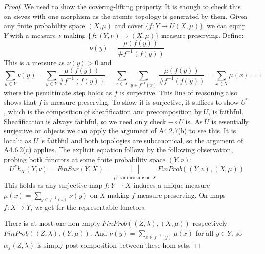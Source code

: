 \documentclass[a4paper]{amsproc}
\theoremstyle{plain}
\theoremstyle{definition}
\theoremstyle{remark}
\numberwithin{equation}{section}
\begin{document}
\begin{proof} We need to show the covering-lifting property. It is enough to check this on sieves with one morphism as the atomic topology is generated by them. Given any finite probability space $(X,\mu)$ and cover $\{f: Y\rightarrow U(X,\mu) \}$, we can equip $Y$ with a measure $\nu$ making $\{f: (Y,\nu)\rightarrow (X,\mu) \}$ measure preserving. Define:
\[\nu(y)=\frac{\mu(f(y))}{\# f^{-1}(f(y))} \]
This is a measure as $\nu(y)>0$ and
\[  \sum_{y\in Y}\nu(y)=\sum_{y\in Y}\frac{\mu(f(y))}{\# f^{-1}(f(y))}=\sum_{x\in X}\sum_{y\in f^{-1}(x)}\frac{\mu(f(y))}{\# f^{-1}(f(y))} =\sum_{x\in X}\mu(x)=1\]
where the penultimate step holds as $f$ is surjective. This line of reasoning also shows that $f$ is measure preserving. 
\newline \indent To show it is surjective, it suffices to show $U^*$, which is the composition of sheafification and precomposition by $U$, is faithful. Sheafification is always faithful, so we need only check $-\circ U$ is. As $U$ is essentially surjective on objects we can apply the argument of A4.2.7(b) to see this.
\newline \indent It is localic as $U$ is faithful and both topologies are subcanonical, so the argument of A4.6.2(c) applies.
\newline\indent The explicit equation follows by the following observation, probing both functors at some finite probability space $(Y,\nu)$:
\[U^*h_X(Y,\nu)=FinSur(Y,X)=\bigsqcup_{\mu\text{ is a measure on }X}FinProb((Y,\nu),(X,\mu))\]
This holds as any surjective map $f:Y\rightarrow X$ induces a unique measure $\mu(x)=\sum_{y\in f^{-1}(x)} \nu(y)$ on $X$ making $f$ measure preserving. On maps $f:X\rightarrow Y$, we get for the representable functors:
\begin{center}
\end{center}
There is at most one non-empty $FinProb((Z,\lambda),(X,\mu))$ respectively \linebreak $FinProb((Z,\lambda),(Y,\mu))$. And $\nu(y)=\sum_{x\in f^{-1}(y)} \mu(x)$ for all $y\in Y$, so  $\alpha_f (Z{,} \lambda)$ is simply post composition between these hom-sets.
\end{proof}%
\end{document}
